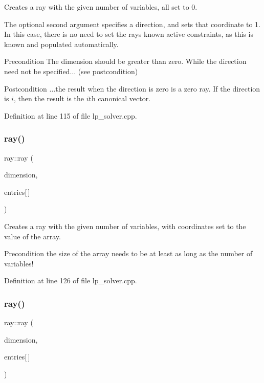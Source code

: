 Creates a ray with the given number of variables, all set to 0. 

The optional second argument specifies a direction, and sets that coordinate to 1. In this case, there is no need to set the ray\textquotesingle{}s known active constraints, as this is known and populated automatically. \begin{DoxyPrecond}{Precondition}
The dimension should be greater than zero. While the direction need not be specified{$\dots$} (see postcondition) 
\end{DoxyPrecond}
\begin{DoxyPostcond}{Postcondition}
{$\dots$}the result when the direction is zero is a zero ray. If the direction is $ i $, then the result is the $i$th canonical vector. 
\end{DoxyPostcond}


Definition at line 115 of file lp\+\_\+solver.\+cpp.

\mbox{\label{classray_a121e66bf83dfa1582edc24505bbc8095}} 
\subsubsection{\texorpdfstring{ray()}{ray()}\hspace{0.1cm}{\footnotesize\ttfamily [2/5]}}
{\footnotesize\ttfamily ray\+::ray (\begin{DoxyParamCaption}\item[{N\+V\+A\+R\+\_\+\+T\+Y\+PE}]{dimension,  }\item[{const R\+A\+Y\+E\+N\+T\+\_\+\+T\+Y\+PE}]{entries\mbox{[}$\,$\mbox{]} }\end{DoxyParamCaption})}



Creates a ray with the given number of variables, with coordinates set to the value of the array. 

\begin{DoxyPrecond}{Precondition}
the size of the array needs to be at least as long as the number of variables! 
\end{DoxyPrecond}


Definition at line 126 of file lp\+\_\+solver.\+cpp.

\mbox{\label{classray_a3639433d20b97abc32b56ca93779dcaf}} 
\subsubsection{\texorpdfstring{ray()}{ray()}\hspace{0.1cm}{\footnotesize\ttfamily [3/5]}}
{\footnotesize\ttfamily ray\+::ray (\begin{DoxyParamCaption}\item[{N\+V\+A\+R\+\_\+\+T\+Y\+PE}]{dimension,  }\item[{const E\+X\+P\+\_\+\+T\+Y\+PE}]{entries\mbox{[}$\,$\mbox{]} }\end{DoxyParamCaption})}



